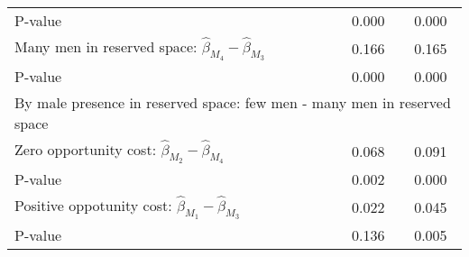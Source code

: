 \begin{tabular}{l*{2}{c}}
\quad P-value       &       0.000         &       0.000         \\
\quad Many men in reserved space: $\hat\beta_{M_4} - \hat\beta_{M_3}$ &       0.166         &       0.165         \\
\quad P-value       &       0.000         &       0.000         \\
\multicolumn{3}{l}{By male presence in reserved space: few men - many men in reserved space} \\ \quad Zero opportunity cost: $\hat\beta_{M_2} - \hat\beta_{M_4}$&       0.068         &       0.091         \\
\quad P-value       &       0.002         &       0.000         \\
\quad Positive oppotunity cost: $\hat\beta_{M_1} - \hat\beta_{M_3}$ &       0.022         &       0.045         \\
\quad P-value       &       0.136         &       0.005         \\
\hline\hline \end{tabular}
